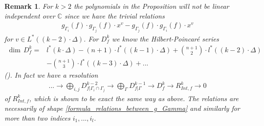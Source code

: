 \documentclass[12pt, english]{article}
\newtheorem{remark}[definition]{Remark}
\DeclareMathOperator{\Gr}{Gr}
\begin{document}
\begin{remark} \label{remark_generators_of_D_f_k_all_relations}
	\normalfont
	For $k> 2$ the polynomials in the Proposition will not be linear independent over $\mathbb{C}$ since we have the trivial relations
	\begin{align} \label{formula_relations_between_g_Gamma}
		g_{\Gamma_i}(f) \cdot g_{\Gamma_j}(f) \cdot x^v - g_{\Gamma_j}(f) \cdot g_{\Gamma_i}(f) \cdot x^v
	\end{align}
	for $v \in L^*((k-2) \cdot \Delta)$. For $D_f^k$ we know the \textit{Hilbert-Poincaré series} 
	\begin{align*}
		\dim \, D_f^k = &l^*(k \cdot \Delta) - (n+1) \cdot l^*((k-1) \cdot \Delta) + \binom{n+1}{2} \cdot l^*((k-2) \cdot \Delta) \\
		&- \binom{n+1}{3} \cdot l^*((k-3) \cdot \Delta) + ...
	\end{align*}
	(\cite[Prop.9.0.4]{Bat93}). In fact we have a resolution
	\begin{align*}
		... \rightarrow \bigoplus_{i,j} D_{f \vert{\Gamma_i \cap \Gamma_j}}^{k-2} \rightarrow \bigoplus_{\Gamma} D_{f \vert{\Gamma}}^{k-1} \rightarrow D_f^k \rightarrow R_{Int,f}^k \rightarrow 0
	\end{align*}
	of $R_{Int,f}^k$, which is shown to be exact the same way as above.
	The relations are necessarily of shape \ref{formula_relations_between_g_Gamma} and similarly for more than two indices $i_1,...,i_l$.
	
\end{remark}

\end{document}
